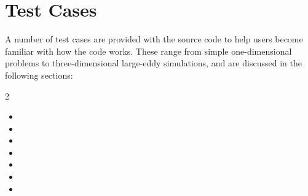 \section{Test Cases}

A number of test cases are provided with the source code to help users
become familiar with how the code works.
%
These range from simple one-dimensional problems to three-dimensional
large-eddy simulations, and are discussed in the following sections:

\begin{multicols}{2}
\raggedcolumns %
\begin{itemize}
\item {}
\item {}
\item {}
\item {}
\item {}
\item {}
\item {}
\end{itemize}
\end{multicols}



\newpage






%
%
%
%

